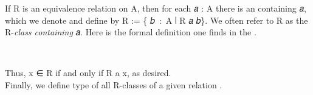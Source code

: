 \documentclass[a4paper,UKenglish,cleveref,autoref,thm-restate,11pt]{lipics-v2021}
\begin{document}
If \ab R is an equivalence relation on \ab A, then for each \ab 𝑎 \as : \ab A there is an  containing \ab 𝑎, which we denote and define by \af [ \ab 𝑎 \af ] \ab R := \{ \ab 𝑏~\as :~\ab A ∣ \ab R \ab 𝑎 \ab 𝑏\}. We often refer to \af [ \ab 𝑎 \af ] \ab R as the \ab R-\emph{class containing} \ab 𝑎. Here is the formal definition one finds in the \ualib.
\ccpad
\begin{code}%
\>[1]\AgdaOperator{\AgdaFunction{[\AgdaUnderscore{}]\AgdaUnderscore{}}}\AgdaSpace{}%
\AgdaSymbol{:}\AgdaSpace{}%
\AgdaSymbol{\{}\AgdaSpace{}%
\AgdaSymbol{:}\AgdaSpace{}%
\AgdaSpace{}%
\AgdaSpace{}%
\AgdaSymbol{\}}\AgdaSpace{}%
\AgdaSpace{}%
\AgdaSpace{}%
\AgdaSpace{}%
\AgdaSpace{}%
\AgdaSpace{}%
\AgdaSpace{}%
\AgdaSpace{}%
\AgdaSpace{}%
\AgdaSpace{}%
\<%
\\
%
\>[1]\AgdaOperator{\AgdaFunction{[}}\AgdaSpace{}%
\AgdaSpace{}%
\AgdaOperator{\AgdaFunction{]}}\AgdaSpace{}%
\AgdaSpace{}%
\AgdaSymbol{=}\AgdaSpace{}%
\AgdaSpace{}%
\AgdaSpace{}%
\AgdaSpace{}%
\AgdaSpace{}%
\AgdaSpace{}%
\<%
\end{code}
\ccpad
Thus, \ab x \as ∈ \af [ \ab a \af ] \ab R if and only if \ab R \ab a \ab x, as desired.\\[4pt]
Finally, we define type of all \ab R-classes of a given relation .
\ccpad
\end{document}
